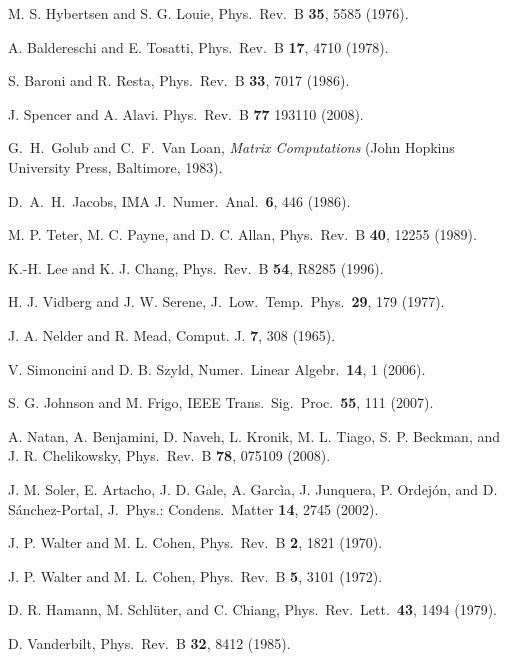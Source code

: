 \documentclass[twocolumn,prb,showpacs,superscriptaddress]{revtex4}
\begin{document}
\begin{thebibliography}{99}
M. S. Hybertsen and S. G. Louie,
Phys.\ Rev.\ B {\bf 35}, 5585 (1976).

A. Baldereschi and E. Tosatti,
Phys.\ Rev.\ B {\bf 17}, 4710 (1978).

S. Baroni and R. Resta,
Phys.\ Rev.\ B {\bf 33}, 7017 (1986).

J. Spencer and A. Alavi.
Phys.\ Rev.\ B {\bf 77} 193110 (2008).

G.\ H.\ Golub and C.\ F.\ Van Loan, {\it Matrix Computations} (John Hopkins University Press, Baltimore, 1983).

D.\ A.\ H.\ Jacobs,
IMA J.\ Numer.\ Anal.\ {\bf 6}, 446 (1986).

M. P. Teter, M. C. Payne, and D. C. Allan,
Phys.\ Rev.\ B {\bf 40}, 12255 (1989).

K.-H. Lee and K. J. Chang,
Phys.\ Rev.\ B {\bf 54}, R8285 (1996).

H. J. Vidberg and J. W. Serene,
J.\ Low.\ Temp.\ Phys.\ {\bf 29}, 179 (1977).

J. A. Nelder and R. Mead,
Comput. J. {\bf 7}, 308 (1965).

V. Simoncini and D. B. Szyld,
Numer.\ Linear Algebr.\ {\bf 14}, 1 (2006).

S. G. Johnson and M. Frigo,
IEEE Trans.\ Sig.\ Proc.\ {\bf 55}, 111 (2007).

A. Natan, A. Benjamini, D. Naveh, L. Kronik, M. L. Tiago, S. P. Beckman, and J. R. Chelikowsky,
Phys.\ Rev.\ B {\bf 78}, 075109 (2008).

J. M. Soler, E. Artacho, J. D. Gale, A. Garc\`ia, J. Junquera, P. Ordej\'on, and D. S\'anchez-Portal,
J.\ Phys.: Condens.\ Matter {\bf 14}, 2745 (2002).

J. P. Walter and M. L. Cohen,
Phys.\ Rev.\ B {\bf 2}, 1821 (1970).

J. P. Walter and M. L. Cohen,
Phys.\ Rev.\ B {\bf 5}, 3101 (1972).

D. R. Hamann, M. Schl\"uter, and C. Chiang,
Phys.\ Rev.\ Lett.\ {\bf 43}, 1494 (1979).

D. Vanderbilt, 
Phys.\ Rev.\ B {\bf 32}, 8412 (1985).


\end{thebibliography}
\end{document}
